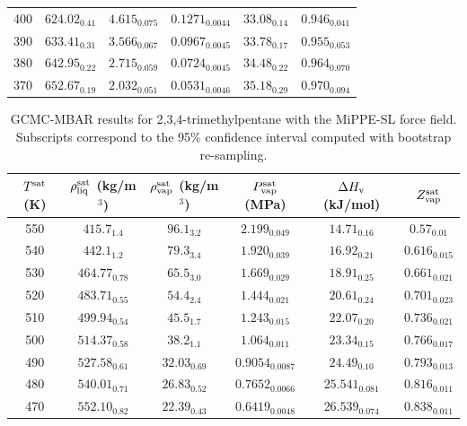 \documentclass[journal=jctc,manuscript=article]{achemso}
\begin{document}
\begin{table}[htb!]
\begin{center}
\begin{tabular}{|c|c|c|c|c|c|}
			400 & $624.02_{0.41}$ & $4.615_{0.075}$ & $0.1271_{0.0044}$ & $33.08_{0.14}$ & $0.946_{0.041}$ \\
			390 & $633.41_{0.31}$ & $3.566_{0.067}$ & $0.0967_{0.0045}$ & $33.78_{0.17}$ & $0.955_{0.053}$ \\
			380 & $642.95_{0.22}$ & $2.715_{0.059}$ & $0.0724_{0.0045}$ & $34.48_{0.22}$ & $0.964_{0.070}$ \\
			370 & $652.67_{0.19}$ & $2.032_{0.051}$ & $0.0531_{0.0046}$ & $35.18_{0.29}$ & $0.970_{0.094}$ \\
			\hline
		\end{tabular}
	\end{center}
\end{table}

\begin{table}[htb!]
	\caption{GCMC-MBAR results for 2,3,4-trimethylpentane with the MiPPE-SL force field. Subscripts correspond to the 95\% confidence interval computed with bootstrap re-sampling.}
	\begin{center}
		\begin{tabular}{|c|c|c|c|c|c|}
			\hline
			$T^{\rm sat}$ (K) & $\rho_{\rm liq}^{\rm sat}$ (kg/m$^3$) & $\rho_{\rm vap}^{\rm sat}$ (kg/m$^3$) & $P_{\rm vap}^{\rm sat}$ (MPa) & $\Delta H_{\rm v}$ (kJ/mol) & $Z_{\rm vap}^{\rm sat}$ \\ \hline
			550 & $415.7_{1.4}$ & $96.1_{3.2}$ & $2.199_{0.049}$ & $14.71_{0.16}$ & $0.57_{0.01}$ \\
			540 & $442.1_{1.2}$ & $79.3_{3.4}$ & $1.920_{0.039}$ & $16.92_{0.21}$ & $0.616_{0.015}$ \\
			530 & $464.77_{0.78}$ & $65.5_{3.0}$ & $1.669_{0.029}$ & $18.91_{0.25}$ & $0.661_{0.021}$ \\
			520 & $483.71_{0.55}$ & $54.4_{2.4}$ & $1.444_{0.021}$ & $20.61_{0.24}$ & $0.701_{0.023}$ \\
			510 & $499.94_{0.54}$ & $45.5_{1.7}$ & $1.243_{0.015}$ & $22.07_{0.20}$ & $0.736_{0.021}$ \\
			500 & $514.37_{0.58}$ & $38.2_{1.1}$ & $1.064_{0.011}$ & $23.34_{0.15}$ & $0.766_{0.017}$ \\
			490 & $527.58_{0.61}$ & $32.03_{0.69}$ & $0.9054_{0.0087}$ & $24.49_{0.10}$ & $0.793_{0.013}$ \\
			480 & $540.01_{0.71}$ & $26.83_{0.52}$ & $0.7652_{0.0066}$ & $25.541_{0.081}$ & $0.816_{0.011}$ \\
			470 & $552.10_{0.82}$ & $22.39_{0.43}$ & $0.6419_{0.0048}$ & $26.539_{0.074}$ & $0.838_{0.011}$ \\

\end{tabular}
\end{center}
\end{table}
\end{document}
